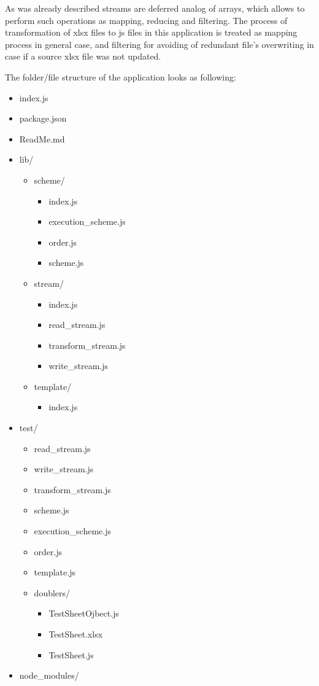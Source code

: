 As was already described streams are deferred analog of arrays, which allows to perform such operations as mapping, reducing and filtering. The process of transformation of xlsx files to js files in this application is treated as mapping process in general case, and filtering for avoiding of redundant file's overwriting in case if a source xlsx file was not updated.

The folder/file structure of the application looks as following:
\begin{itemize}
	\item index.js
	\item package.json
	\item ReadMe.md
	\item lib/
	\begin{itemize}
		\item scheme/
		\begin{itemize}
			\item index.js
			\item execution\_scheme.js
			\item order.js
			\item scheme.js
		\end{itemize}
		\item stream/
		\begin{itemize}
			\item index.js
			\item read\_stream.js
			\item transform\_stream.js
			\item write\_stream.js
		\end{itemize}
		\item template/
		\begin{itemize}
			\item index.js
		\end{itemize}
	\end{itemize}
	\item test/
	\begin{itemize}
		\item read\_stream.js
		\item write\_stream.js
		\item transform\_stream.js
		\item scheme.js
		\item execution\_scheme.js
		\item order.js
		\item template.js
		\item doublers/
		\begin{itemize}
			\item TestSheetOjbect.js
			\item TestSheet.xlsx
			\item TestSheet.js
		\end{itemize}
	\end{itemize}
	\item node\_modules/
\end{itemize}
